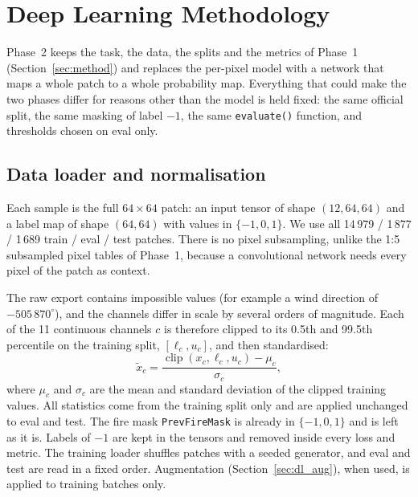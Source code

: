 
\section{Deep Learning Methodology}
\label{sec:dl_method}

Phase~2 keeps the task, the data, the splits and the metrics of Phase~1 (Section~\ref{sec:method}) and
replaces the per-pixel model with a network that maps a whole patch to a whole probability map. Everything
that could make the two phases differ for reasons other than the model is held fixed: the same official
split, the same masking of label $-1$, the same \texttt{evaluate()} function, and thresholds chosen on
eval only.

\subsection{Data loader and normalisation}

Each sample is the full $64\times64$ patch: an input tensor of shape $(12, 64, 64)$ and a label map of
shape $(64, 64)$ with values in $\{-1, 0, 1\}$. We use all 14\,979 / 1\,877 / 1\,689 train / eval / test
patches. There is no pixel subsampling, unlike the 1:5 subsampled pixel tables of Phase~1, because a
convolutional network needs every pixel of the patch as context.

The raw export contains impossible values (for example a wind direction of $-505\,870^\circ$), and the
channels differ in scale by several orders of magnitude. Each of the 11 continuous channels $c$ is
therefore clipped to its 0.5th and 99.5th percentile on the training split, $[\ell_c, u_c]$, and then
standardised:
\begin{equation}
\tilde x_c = \frac{\operatorname{clip}(x_c, \ell_c, u_c) - \mu_c}{\sigma_c},
\label{eq:dl_norm}
\end{equation}
where $\mu_c$ and $\sigma_c$ are the mean and standard deviation of the clipped training values. All
statistics come from the training split only and are applied unchanged to eval and test. The fire mask
\texttt{PrevFireMask} is already in $\{-1, 0, 1\}$ and is left as it is. Labels of $-1$ are kept in the
tensors and removed inside every loss and metric. The training loader shuffles patches with a seeded
generator, and eval and test are read in a fixed order. Augmentation (Section~\ref{sec:dl_aug}), when
used, is applied to training batches only.

